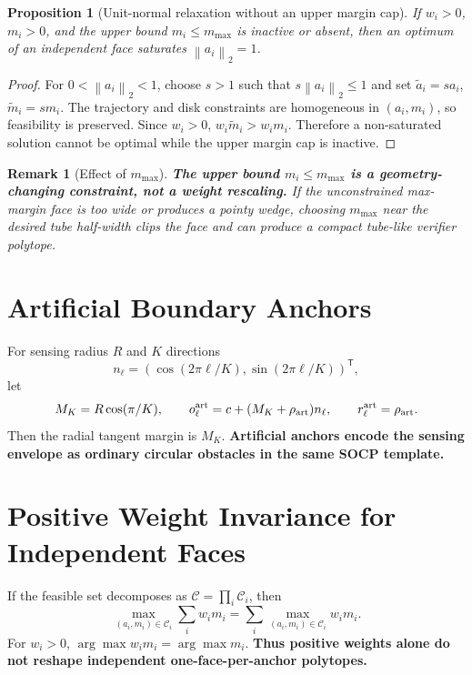 \documentclass[11pt]{article}
\newtheorem{proposition}{Proposition}
\newtheorem{remark}{Remark}
\newcommand{\norm}[1]{\left\lVert #1\right\rVert_2}
\newcommand{\trans}{^{\mathsf T}}
\begin{document}
\begin{proposition}[Unit-normal relaxation without an upper margin cap]
If $w_i>0$, $m_i>0$, and the upper bound $m_i\le m_{\max}$ is inactive or absent, then an optimum of an independent face saturates $\norm{a_i}=1$.
\end{proposition}
\begin{proof}
For $0<\norm{a_i}<1$, choose $s>1$ such that $s\norm{a_i}\le1$ and set $\tilde a_i=s a_i$, $\tilde m_i=s m_i$.  The trajectory and disk constraints are homogeneous in $(a_i,m_i)$, so feasibility is preserved. Since $w_i>0$, $w_i\tilde m_i>w_i m_i$.  Therefore a non-saturated solution cannot be optimal while the upper margin cap is inactive.
\end{proof}

\begin{remark}[Effect of $m_{\max}$]
\textbf{The upper bound $m_i\le m_{\max}$ is a geometry-changing constraint, not a weight rescaling.}  If the unconstrained max-margin face is too wide or produces a pointy wedge, choosing $m_{\max}$ near the desired tube half-width clips the face and can produce a compact tube-like verifier polytope.
\end{remark}

\section{Artificial Boundary Anchors}
For sensing radius $R$ and $K$ directions
\[
 n_\ell=(\cos(2\pi\ell/K),\sin(2\pi\ell/K))\trans,
\]
let
\[
    M_K=R\cos(\pi/K),\qquad
    o_\ell^{\rm art}=c+(M_K+\rho_{\rm art})n_\ell,
    \qquad r_\ell^{\rm art}=\rho_{\rm art}.
\]
Then the radial tangent margin is $M_K$.  \textbf{Artificial anchors encode the sensing envelope as ordinary circular obstacles in the same SOCP template.}

\section{Positive Weight Invariance for Independent Faces}
If the feasible set decomposes as $\mathcal C=\prod_i\mathcal C_i$, then
\[
\max_{(a_i,m_i)\in\mathcal C_i}\sum_i w_i m_i
=\sum_i\max_{(a_i,m_i)\in\mathcal C_i}w_i m_i.
\]
For $w_i>0$, $\arg\max w_i m_i=\arg\max m_i$.  \textbf{Thus positive weights alone do not reshape independent one-face-per-anchor polytopes.}
\end{document}
